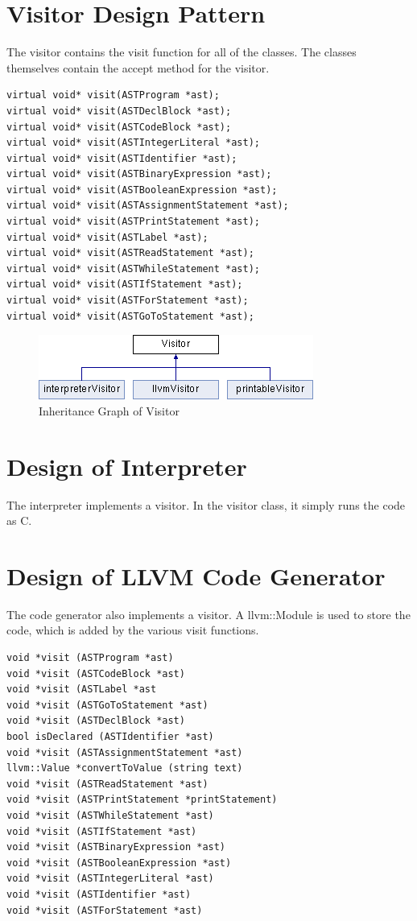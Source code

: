 \documentclass[12pt]{report}
\begin{document}
\section*{Visitor Design Pattern}
The visitor contains the visit function for all of the classes. The classes themselves contain the accept method for the visitor.
\begin{lstlisting}
virtual void* visit(ASTProgram *ast);
virtual void* visit(ASTDeclBlock *ast);
virtual void* visit(ASTCodeBlock *ast);
virtual void* visit(ASTIntegerLiteral *ast);
virtual void* visit(ASTIdentifier *ast);
virtual void* visit(ASTBinaryExpression *ast);
virtual void* visit(ASTBooleanExpression *ast);
virtual void* visit(ASTAssignmentStatement *ast);
virtual void* visit(ASTPrintStatement *ast);
virtual void* visit(ASTLabel *ast);
virtual void* visit(ASTReadStatement *ast);
virtual void* visit(ASTWhileStatement *ast);
virtual void* visit(ASTIfStatement *ast); 
virtual void* visit(ASTForStatement *ast);
virtual void* visit(ASTGoToStatement *ast);
\end{lstlisting}
\begin{figure}[h]
 \includegraphics[width=\linewidth]{class_visitor.png}
 \caption{Inheritance Graph of Visitor}
 \label{fig:figure2}
\end{figure}
\section*{Design of Interpreter}
The interpreter implements a visitor. In the visitor class, it simply runs the code as C.
\section*{Design of LLVM Code Generator}
The code generator also implements a visitor. A llvm::Module is used to store the code, which is added by the various visit functions.
\begin{lstlisting}
void *visit (ASTProgram *ast)
void *visit (ASTCodeBlock *ast)
void *visit (ASTLabel *ast  
void *visit (ASTGoToStatement *ast)
void *visit (ASTDeclBlock *ast)
bool isDeclared (ASTIdentifier *ast)
void *visit (ASTAssignmentStatement *ast)
llvm::Value *convertToValue (string text)
void *visit (ASTReadStatement *ast)
void *visit (ASTPrintStatement *printStatement)
void *visit (ASTWhileStatement *ast)
void *visit (ASTIfStatement *ast)
void *visit (ASTBinaryExpression *ast)
void *visit (ASTBooleanExpression *ast)
void *visit (ASTIntegerLiteral *ast)
void *visit (ASTIdentifier *ast) 
void *visit (ASTForStatement *ast)
\end{lstlisting}
\end{document}
